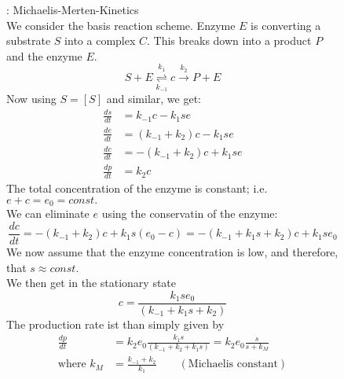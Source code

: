 \begin{figure}[H]
	\textbf{\underline{\underline{}}}: Michaelis-Merten-Kinetics\vspace{0.2cm}\\
	We consider the basis reaction scheme. Enzyme $E$ is converting a substrate $S$ into a complex $C$. This breaks down into a product $P$ and the enzyme $E$.
	\begin{equation*}
		S+E\overset{k_1}{\underset{k_{-1}}{\rightleftharpoons}} c\overset{k_2}{\to}P+E
	\end{equation*}
	Now using $S=[S]$ and similar, we get:
	\begin{align*}
		\frac{ds}{dt}&=k_{-1}c-k_1se\\
		\frac{de}{dt}&=(k_{-1}+k_2)c-k_{1}se\\
		\frac{dc}{dt}&=-(k_{-1}+k_2)c+k_1se\\
		\frac{dp}{dt}&=k_2c
	\end{align*}
	The total concentration of the enzyme is constant; i.e. $e+c=e_0=const.$\\
	We can eliminate $e$ using the conservatin of the enzyme:
	\begin{equation*}
		\frac{dc}{dt}=-(k_{-1}+k_2)c+k_1s(e_0-c)=-(k_{-1}+k_1s+k_2)c+k_1se_0
	\end{equation*}
	We now assume that the enzyme concentration is low, and therefore, that $s\approx const.$\\
	We then get in the stationary state 
	\begin{equation*}
		c=\frac{k_1se_0}{(k_{-1}+k_1s+k_2)}
	\end{equation*}
	The production rate ist than simply given by
	\begin{align*}
		\frac{dp}{dt}&=k_2e_0\frac{k_1s}{(k_{-1}+k_2+k_1s)}=k_2e_0\frac{s}{s+k_M}\\
		\text{where } k_M&=\frac{k_{-1}+k_2}{k_1} \qquad (\text{Michaelis constant})
	\end{align*}
\end{figure}
